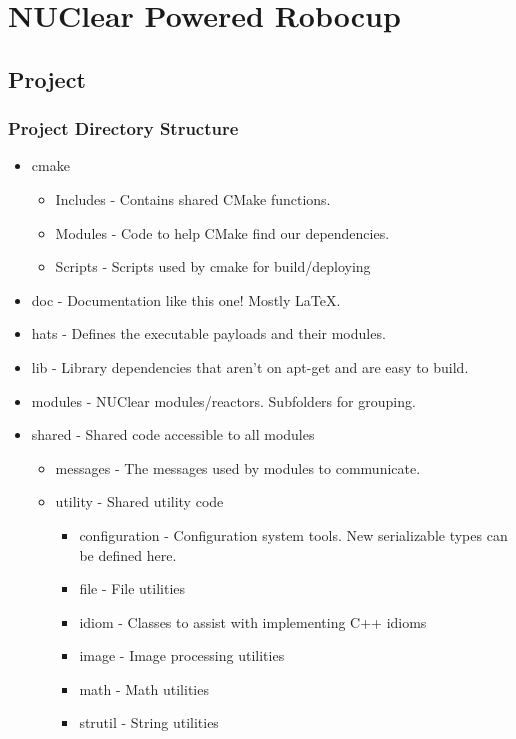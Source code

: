 \documentclass{beamer}
\begin{document}
\section{NUClear Powered Robocup}
\subsection{Project}
\begin{frame}
	\frametitle{Project Directory Structure}
	\footnotesize
	\begin{itemize}
		\item cmake
		\begin{itemize}
			\footnotesize
			\item Includes - Contains shared CMake functions.
			\item Modules -  Code to help CMake find our dependencies.
			\item Scripts - Scripts used by cmake for build/deploying
		\end{itemize}
		
		\item doc - Documentation like this one! Mostly LaTeX.
		\item hats - Defines the executable payloads and their modules.
		\item lib - Library dependencies that aren't on apt-get and are easy to build.
		\item modules - NUClear modules/reactors. Subfolders for grouping.

		\item shared - Shared code accessible to all modules
		\begin{itemize}
			\footnotesize
			\item messages - The messages used by modules to communicate.
			\item utility - Shared utility code
			\begin{itemize}
				\footnotesize
				\item configuration - Configuration system tools. New serializable types can be defined here.
				\item file - File utilities
				\item idiom - Classes to assist with implementing C++ idioms
				\item image - Image processing utilities
				\item math - Math utilities
				\item strutil - String utilities
			\end{itemize}
		\end{itemize}
	\end{itemize}
\end{frame}
\end{document}
